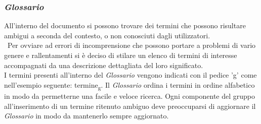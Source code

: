 \subsubsection{\textit{Glossario}}
All'interno del documento si possono trovare dei termini che possono risultare ambigui a seconda del contesto, o non conosciuti dagli utilizzatori.\\\
Per ovviare ad errori di incomprensione che possono portare a problemi di vario genere e rallentamenti si è deciso di stilare un elenco di termini 
di interesse accompagnati da una descrizione dettagliata del loro significato.\\
I termini presenti all'interno del \textit{Glossario} vengono indicati con il pedice 'g' come nell'esempio seguente: termine\textsubscript{g}.
Il \textit{Glossario} ordina i termini in ordine alfabetico in modo da permetterne una facile e veloce ricerca.
Ogni componente del gruppo all'inserimento di un termine ritenuto ambiguo deve preoccuparsi di aggiornare il \textit{Glossario} in modo da mantenerlo sempre aggiornato.
